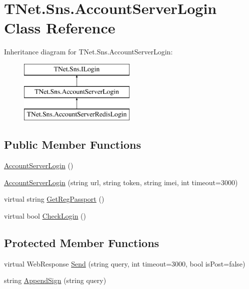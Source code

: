 \hypertarget{class_t_net_1_1_sns_1_1_account_server_login}{}\section{T\+Net.\+Sns.\+Account\+Server\+Login Class Reference}
\label{class_t_net_1_1_sns_1_1_account_server_login}


 


Inheritance diagram for T\+Net.\+Sns.\+Account\+Server\+Login\+:\begin{figure}[H]
\begin{center}
\leavevmode
\includegraphics[height=3.000000cm]{class_t_net_1_1_sns_1_1_account_server_login}
\end{center}
\end{figure}
\subsection*{Public Member Functions}
\begin{DoxyCompactItemize}
\item 
\mbox{\hyperlink{class_t_net_1_1_sns_1_1_account_server_login_acfb12197080e053ccb7a025f6c2bc2ee}{Account\+Server\+Login}} ()
\item 
\mbox{\hyperlink{class_t_net_1_1_sns_1_1_account_server_login_a54e9766a99229a9faa0e2ccf64f803bf}{Account\+Server\+Login}} (string url, string token, string imei, int timeout=3000)
\item 
virtual string \mbox{\hyperlink{class_t_net_1_1_sns_1_1_account_server_login_afb41f63a3d82a333820da668c2eaf289}{Get\+Reg\+Passport}} ()
\item 
virtual bool \mbox{\hyperlink{class_t_net_1_1_sns_1_1_account_server_login_a5ba57d3d6cd8792896e79dad1734e46a}{Check\+Login}} ()
\end{DoxyCompactItemize}
\subsection*{Protected Member Functions}
\begin{DoxyCompactItemize}
\item 
virtual Web\+Response \mbox{\hyperlink{class_t_net_1_1_sns_1_1_account_server_login_a8d6065c485a91329e271418edc675ae0}{Send}} (string query, int timeout=3000, bool is\+Post=false)
\item 
string \mbox{\hyperlink{class_t_net_1_1_sns_1_1_account_server_login_af3920f22e58dcc2d85b8941860dffb62}{Append\+Sign}} (string query)
\end{DoxyCompactItemize}
